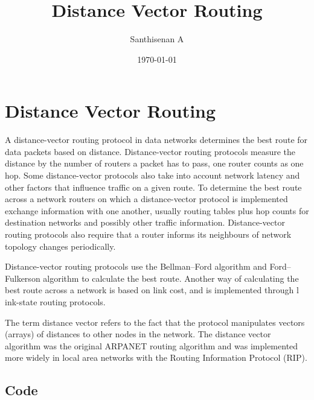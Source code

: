 \documentclass[a4paper,12pt]{article}
\begin{document}
    
\title{Distance Vector Routing}
\author{Santhisenan A}
\date{\today}
\maketitle

\section{Distance Vector Routing}
A distance-vector routing protocol in data networks determines the best route for 
data packets based on distance. Distance-vector routing protocols measure the distance by
the number of routers a packet has to pass, one router counts as one hop. Some 
distance-vector protocols also take into account network latency and other factors
that influence traffic on a given route. To determine the best route across a network
routers on which a distance-vector protocol is implemented exchange information with one another,
usually routing tables plus hop counts for destination networks and possibly other traffic information.
Distance-vector routing protocols also require that a router informs its neighbours of network topology 
changes periodically.

Distance-vector routing protocols use the Bellman–Ford algorithm and 
Ford–Fulkerson algorithm to calculate the best route. Another way of calculating 
the best route across a network is based on link cost, and is implemented through l
ink-state routing protocols.

The term distance vector refers to the fact that the protocol manipulates 
vectors (arrays) of distances to other nodes in the network. The distance vector
 algorithm was the original ARPANET routing algorithm and was implemented more widely 
 in local area networks with the Routing Information Protocol (RIP).
\subsection{Code}
\end{document}
